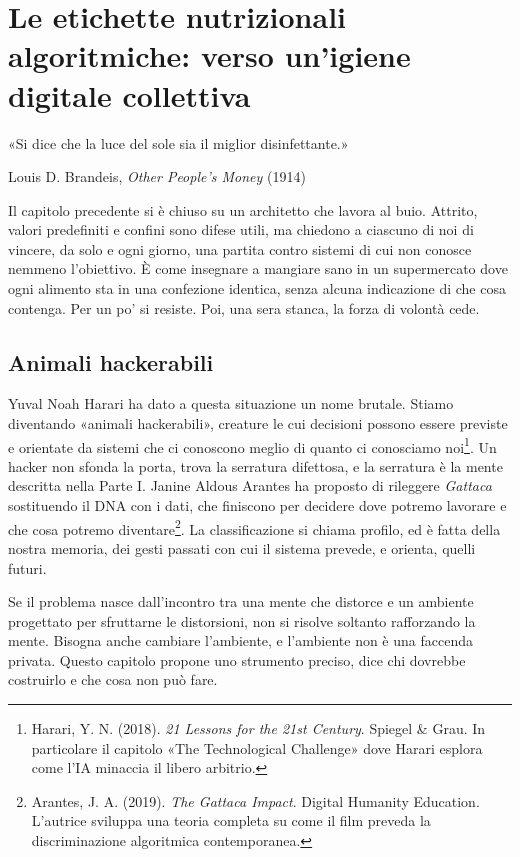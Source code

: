 \chapter{Le etichette nutrizionali algoritmiche: verso un'igiene digitale collettiva}
\label{cap:p4c31}

\epigraph{«Si dice che la luce del sole sia il miglior disinfettante.»}{Louis D. Brandeis, \textit{Other People's Money} (1914)}

Il capitolo precedente si è chiuso su un architetto che lavora al buio. Attrito, valori predefiniti e confini sono difese utili, ma chiedono a ciascuno di noi di vincere, da solo e ogni giorno, una partita contro sistemi di cui non conosce nemmeno l'obiettivo. È come insegnare a mangiare sano in un supermercato dove ogni alimento sta in una confezione identica, senza alcuna indicazione di che cosa contenga. Per un po' si resiste. Poi, una sera stanca, la forza di volontà cede.

\section{Animali hackerabili}
\label{sec:p4c31-animali-hackerabili-e}
Yuval Noah Harari ha dato a questa situazione un nome brutale. Stiamo diventando «animali hackerabili», creature le cui decisioni possono essere previste e orientate da sistemi che ci conoscono meglio di quanto ci conosciamo noi\footnote{Harari, Y. N. (2018). \textit{21 Lessons for the 21st Century}. Spiegel \& Grau. In particolare il capitolo «The Technological Challenge» dove Harari esplora come l'IA minaccia il libero arbitrio.}. Un hacker non sfonda la porta, trova la serratura difettosa, e la serratura è la mente descritta nella Parte I. Janine Aldous Arantes ha proposto di rileggere \textit{Gattaca} sostituendo il DNA con i dati, che finiscono per decidere dove potremo lavorare e che cosa potremo diventare\footnote{Arantes, J. A. (2019). \textit{The Gattaca Impact}. Digital Humanity Education. L'autrice sviluppa una teoria completa su come il film preveda la discriminazione algoritmica contemporanea.}. La classificazione si chiama profilo, ed è fatta della nostra memoria, dei gesti passati con cui il sistema prevede, e orienta, quelli futuri.

Se il problema nasce dall'incontro tra una mente che distorce e un ambiente progettato per sfruttarne le distorsioni, non si risolve soltanto rafforzando la mente. Bisogna anche cambiare l'ambiente, e l'ambiente non è una faccenda privata. Questo capitolo propone uno strumento preciso, dice chi dovrebbe costruirlo e che cosa non può fare.

